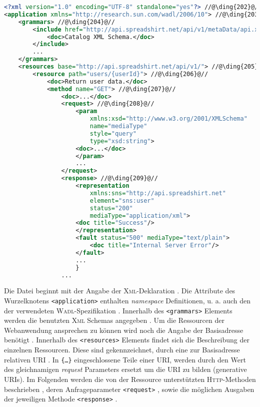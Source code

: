 \begin{lstlisting}[language=XML, caption={Beispielaufbau einer \textsc{Wadl}-Datei anhand der Spreadshirt-\textsc{Api} Beschreibung}, label=lst:wadlstructure, name=wadlstructure]
<?xml version="1.0" encoding="UTF-8" standalone="yes"?> //@\ding{202}@//
<application xmlns="http://research.sun.com/wadl/2006/10"> //@\ding{203}@//
    <grammars> //@\ding{204}@//
        <include href="http://api.spreadshirt.net/api/v1/metaData/api.xsd">
            <doc>Catalog XML Schema.</doc>
        </include>
        ...
    </grammars>
    <resources base="http://api.spreadshirt.net/api/v1/"> //@\ding{205}@//
        <resource path="users/{userId}"> //@\ding{206}@//
            <doc>Return user data.</doc>
            <method name="GET"> //@\ding{207}@//
                <doc>...</doc>
                <request> //@\ding{208}@//
                    <param 
                        xmlns:xsd="http://www.w3.org/2001/XMLSchema" 
                        name="mediaType" 
                        style="query" 
                        type="xsd:string">
                    <doc>...</doc>
                    </param>
                    ...
                </request>
                <response> //@\ding{209}@//
                    <representation 
                        xmlns:sns="http://api.spreadshirt.net"
                        element="sns:user" 
                        status="200" 
                        mediaType="application/xml">
                    <doc title="Success"/>
                    </representation>
                    <fault status="500" mediaType="text/plain">
                        <doc title="Internal Server Error"/>
                    </fault>
                    ...
                    }
                ...
\end{lstlisting}

Die Datei beginnt mit der Angabe der \textsc{Xml}-Deklaration .
Die Attribute des Wurzelknotens \texttt{<application>} enthalten \emph{namespace} Definitionen, u. a. auch den der verwendeten \textsc{Wadl}-Spezifikation .
Innerhalb des \texttt{<grammars>} Elements werden die benutzten \textsc{Xml} Schemas angegeben . 
Um die Ressourcen der Webanwendung ansprechen zu können wird noch die Angabe der Basisadresse benötigt . 
Innerhalb des \texttt{<resources>} Elements findet sich die Beschreibung der einzelnen Ressourcen. Diese sind gekennzeichnet, durch eine zur Basisadresse relativen \gls{URI} . In \texttt{\{\ldots\}} eingeschlossene Teile einer \gls{URI}, werden durch den Wert des gleichnamigen \emph{request} Parameters ersetzt um die \gls{URI} zu bilden (generative \glspl{URI}).
Im Folgenden werden die von der Ressource unterstützten \textsc{Http}-Methoden beschrieben , deren Anfrageparameter \texttt{<request>} , sowie die möglichen Ausgaben der jeweiligen Methode \texttt{<response>} .

